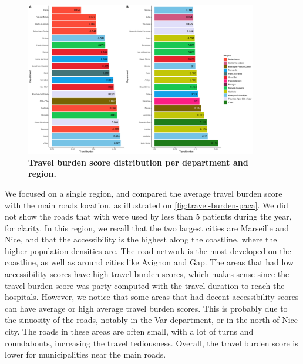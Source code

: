 \begin{figure}[h!]
    \includegraphics[width=0.9\textwidth]{images/routes/sup_fig_2.png}
    \centering
    \caption{
        \textbf{Travel burden score distribution per department and region.}}
    \label{fig:routes-burden-departments-top-bottom-20}
\end{figure}

We focused on a single region, and compared the average travel burden score with
the main roads location, as illustrated on \cref{fig:travel-burden-paca}. We did
not show the roads that with were used by less than 5 patients during the year,
for clarity. In this region, we recall that the two largest cities are Marseille
and Nice, and that the accessibility is the highest along the coastline, where
the higher population densities are. The road network is the most developed on
the coastline, as well as around cities like Avignon and Gap. The areas that had
low accessibility scores have high travel burden scores, which makes sense since
the travel burden score was party computed with the travel duration to reach the
hospitals. However, we notice that some areas that had decent accessibility
scores can have average or high average travel burden scores. This is probably
due to the sinuosity of the roads, notably in the Var department, or in the
north of Nice city. The roads in these areas are often small, with a lot of
turns and roundabouts, increasing the travel tediousness. Overall, the travel
burden score is lower for municipalities near the main roads.

